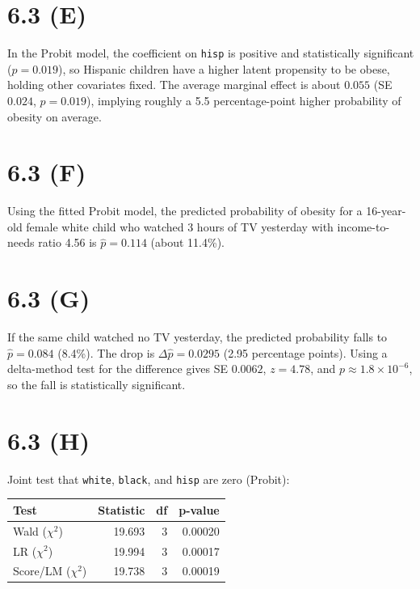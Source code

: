\documentclass{article}
\begin{document}
\clearpage
\section*{6.3 (E)}

﻿\noindent In the Probit model, the coefficient on \texttt{hisp} is positive and statistically significant (\(p=0.019\)), so Hispanic children have a higher latent propensity to be obese, holding other covariates fixed. The average marginal effect is about \(0.055\) (SE \(0.024\), \(p=0.019\)), implying roughly a 5.5 percentage-point higher probability of obesity on average.

\clearpage
\section*{6.3 (F)}

﻿\noindent Using the fitted Probit model, the predicted probability of obesity for a 16-year-old female white child who watched 3 hours of TV yesterday with income-to-needs ratio 4.56 is \(\hat{p}=0.114\) (about 11.4\%).

\clearpage
\section*{6.3 (G)}

﻿\noindent If the same child watched no TV yesterday, the predicted probability falls to \(\hat{p}=0.084\) (8.4\%). The drop is \(\Delta \hat{p}=0.0295\) (2.95 percentage points). Using a delta-method test for the difference gives SE \(0.0062\), \(z=4.78\), and \(p\approx1.8\times10^{-6}\), so the fall is statistically significant.

\clearpage
\section*{6.3 (H)}

\noindent Joint test that \texttt{white}, \texttt{black}, and \texttt{hisp} are zero (Probit):

\begin{table}[H]
\centering
\begin{tabular}{lrrr}
\toprule
Test & Statistic & df & p-value \\
\midrule
Wald ($\chi^2$) & 19.693 & 3 & 0.00020 \\
LR ($\chi^2$) & 19.994 & 3 & 0.00017 \\
Score/LM ($\chi^2$) & 19.738 & 3 & 0.00019 \\
\bottomrule
\end{tabular}
\end{table}
\end{document}
